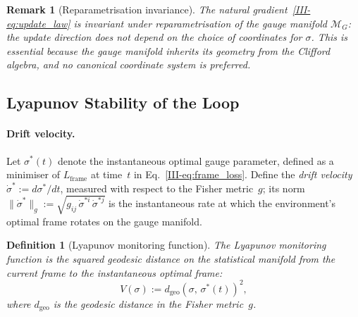 \documentclass[12pt,a4paper,openany]{book}
\newtheorem{definition}[theorem]{Definition}
\newtheorem{remark}[theorem]{Remark}
\begin{document}
\begin{remark}[Reparametrisation invariance]
\label{III-rem:reparam}
The natural gradient~\eqref{III-eq:update_law} is invariant
under reparametrisation of the gauge manifold
$\mathcal{M}_G$: the update direction does not depend on the
choice of coordinates for $\sigma$.
This is essential because the gauge manifold inherits its
geometry from the Clifford algebra, and no canonical
coordinate system is preferred.
\end{remark}

\subsection{Lyapunov Stability of the Loop}
\label{III-subsec:lyapunov}

\paragraph{Drift velocity.}
Let $\sigma^*(t)$ denote the instantaneous optimal gauge
parameter, defined as a minimiser of $L_{\mathrm{frame}}$
at time~$t$ in Eq.~\eqref{III-eq:frame_loss}.
Define the \emph{drift velocity}
$\dot{\sigma}^* := d\sigma^*/dt$, measured with respect to
the Fisher metric~$g$; its norm
$\|\dot{\sigma}^*\|_g
:= \sqrt{g_{ij}\,\dot{\sigma}^{*i}\,\dot{\sigma}^{*j}}$
is the instantaneous rate at which the environment's
optimal frame rotates on the gauge manifold.

\begin{definition}[Lyapunov monitoring function]
\label{III-def:lyapunov}
The \emph{Lyapunov monitoring function} is the squared
geodesic distance on the statistical manifold from the
current frame to the instantaneous optimal frame:
\begin{equation}
\label{III-eq:lyapunov}
V(\sigma)
:= d_{\mathrm{geo}}\!\left(\sigma,\,\sigma^*(t)\right)^2,
\end{equation}
where $d_{\mathrm{geo}}$ is the geodesic distance in the
Fisher metric~$g$.
\end{definition}
\end{document}

